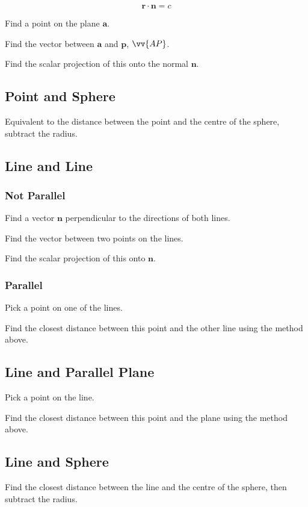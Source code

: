 \documentclass[a4paper,11pt]{report}
\newcommand{\bb}{\boldsymbol}
\begin{document}
$$
\bb{r} \cdot \bb{n} = c
$$

Find a point on the plane $\bb{a}$.

Find the vector between $\bb{a}$ and $\bb{p}$, $\vv{AP}$.

Find the scalar projection of this onto the normal $\bb{n}$.

\subsection{Point and Sphere}

Equivalent to the distance between the point and the centre of the sphere,
subtract the radius.

\subsection{Line and Line}

\subsubsection{Not Parallel}

Find a vector $\bb{n}$ perpendicular to the directions of both lines.

Find the vector between two points on the lines.

Find the scalar projection of this onto $\bb{n}$.

\subsubsection{Parallel}

Pick a point on one of the lines.

Find the closest distance between this point and the other line using the
method above.

\subsection{Line and Parallel Plane}

Pick a point on the line.

Find the closest distance between this point and the plane using the method
above.

\subsection{Line and Sphere}

Find the closest distance between the line and the centre of the sphere, then
subtract the radius.
\end{document}
